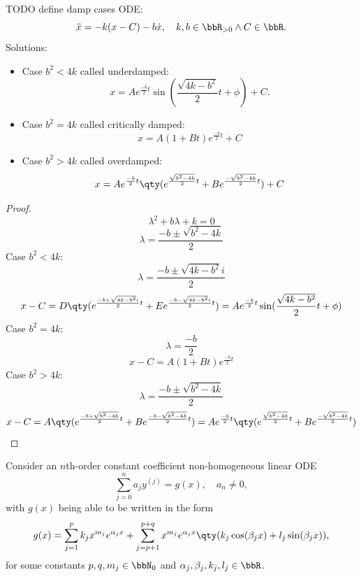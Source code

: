 \documentclass[a4paper,12pt]{report}
\begin{document}
TODO define damp cases
ODE:
\[\ddot{x}=-k(x-C)-b\dot{x},\quad k,b\in\bbR_{>0}\land C\in\bbR.\]
Solutions:
\begin{itemize}
\item Case $b^2<4k$ called underdamped:
\[x=Ae^{\frac{-b}{2}t}\sin(\frac{\sqrt{4k-b^2}}{2}t+\phi)+C.\]
\item Case $b^2=4k$ called critically damped:
\[x=A(1+Bt)e^{\frac{-b}{2}t}+C\]
\item Case $b^2>4k$ called overdamped:
\[x=Ae^{\frac{-b}{2}t}\qty(e^{\frac{\sqrt{b^2-4k}}{2}t}+Be^{\frac{-\sqrt{b^2-4k}}{2}t})+C\]
\end{itemize}
\begin{proof}
\[\lambda^2+b\lambda+k=0\]
\[\lambda=\frac{-b\pm\sqrt{b^2-4k}}{2}\]
Case $b^2<4k$:
\[\lambda=\frac{-b\pm\sqrt{4k-b^2}i}{2}\]
\[x-C=D\qty(e^{\frac{-b+\sqrt{4k-b^2}i}{2}t}+Ee^{\frac{-b-\sqrt{4k-b^2}i}{2}t})=Ae^{\frac{-b}{2}t}\sin(\frac{\sqrt{4k-b^2}}{2}t+\phi)\]
Case $b^2=4k$:
\[\lambda=\frac{-b}{2}\]
\[x-C=A(1+Bt)e^{\frac{-b}{2}t}\]
Case $b^2>4k$:
\[\lambda=\frac{-b\pm\sqrt{b^2-4k}}{2}\]
\[x-C=A\qty(e^{\frac{-b+\sqrt{b^2-4k}}{2}t}+Be^{\frac{-b-\sqrt{b^2-4k}}{2}t})=Ae^{\frac{-b}{2}t}\qty(e^{\frac{\sqrt{b^2-4k}}{2}t}+Be^{\frac{-\sqrt{b^2-4k}}{2}t})\]
\end{proof}
Consider an $n$th-order constant coefficient non-homogeneous linear ODE
\[\sum_{j=0}^na_jy^{(j)}=g(x),\quad a_n\neq 0,\]
with $g(x)$ being able to be written in the form
\[g(x)=\sum_{j=1}^pk_jx^{m_j}e^{\alpha_jx}+\sum_{j=p+1}^{p+q}x^{m_j}e^{\alpha_jx}\qty(k_j\cos(\beta_jx)+l_j\sin(\beta_jx)),\]
for some constants $p,q,m_j\in\bbN_0$ and $\alpha_j,\beta_j,k_j,l_j\in\bbR$.
\end{document}

